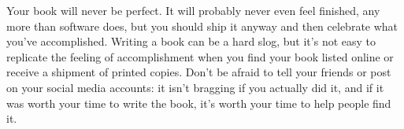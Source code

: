 \documentclass[10pt,letterpaper]{article}
\begin{document}
Your book will never be perfect.
It will probably never even feel finished,
any more than software does,
but you should ship it anyway
and then celebrate what you've accomplished.
Writing a book can be a hard slog,
but it's not easy to replicate the feeling of accomplishment
when you find your book listed online or receive a shipment of printed copies.
Don't be afraid to tell your friends or post on your social media accounts:
it isn't bragging if you actually did it,
and if it was worth your time to write the book,
it's worth your time to help people find it.



\end{document}
